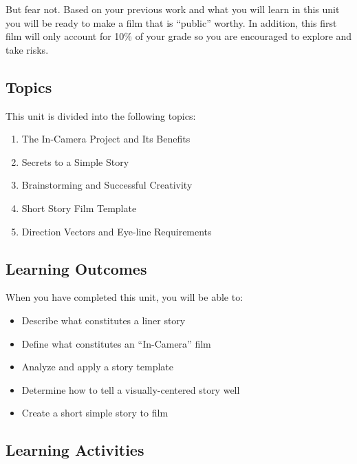 \documentclass[
  letterpaper,
  DIV=11,
  numbers=noendperiod]{scrreprt}
\providecommand{\tightlist}{%
  \setlength{\itemsep}{0pt}\setlength{\parskip}{0pt}}\usepackage{longtable,booktabs,array}
\begin{document}
But fear not. Based on your previous work and what you will learn in
this unit you will be ready to make a film that is ``public'' worthy. In
addition, this first film will only account for 10\% of your grade so
you are encouraged to explore and take risks.

\subsection*{Topics}\label{topics-5}

This unit is divided into the following topics:

\begin{enumerate}
\def\labelenumi{\arabic{enumi}.}
\tightlist
\item
  The In-Camera Project and Its Benefits
\item
  Secrets to a Simple Story
\item
  Brainstorming and Successful Creativity
\item
  Short Story Film Template
\item
  Direction Vectors and Eye-line Requirements
\end{enumerate}

\subsection*{Learning Outcomes}\label{learning-outcomes-5}

When you have completed this unit, you will be able to:

\begin{itemize}
\tightlist
\item
  Describe what constitutes a liner story
\item
  Define what constitutes an ``In-Camera'' film
\item
  Analyze and apply a story template
\item
  Determine how to tell a visually-centered story well
\item
  Create a short simple story to film
\end{itemize}

\subsection*{Learning Activities}\label{learning-activities-5}
\end{document}
